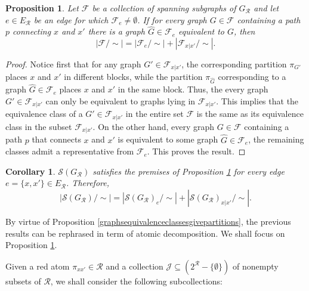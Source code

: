 \documentclass[12pt]{extarticle}
\newtheorem{Corollary}{Corollary}
\newtheorem{Proposition}{Proposition}
\begin{document}
	\begin{Proposition}\label{RecursiveFormula} 	
		Let	$\mathcal{F}$ be a collection of spanning subgraphs of $G_{\mathcal{R}}$ and let $e\in E_{\mathcal{R}}$ be an edge for which $\mathcal{F}_e\neq\emptyset$. If for every graph $G\in\mathcal{F}$ containing a path $p$ connecting $x$ and $x'$ there is a graph $\hat{G}\in\mathcal{F}_e$ equivalent to $G$, then
		\begin{equation}
		|\mathcal{F}/\sim| = 	|\mathcal{F}_e/\sim|+ 	|\mathcal{F}_{x|x'}/\sim|.
		\end{equation}	
	\end{Proposition}
	\begin{proof}
		Notice first that for any graph $G'\in\mathcal{F}_{x|x'}$, the corresponding partition $\pi_{G'}$ places $x$ and $x'$ in different blocks, while the partition $\pi_{\hat{G}}$ corresponding to a graph $\hat{G}\in\mathcal{F}_e$ places $x$ and $x'$ in the same block. Thus, the every graph $G'\in\mathcal{F}_{x|x'}$ can only be equivalent to graphs lying in $\mathcal{F}_{x|x'}$. This implies that the equivalence class of a $G'\in\mathcal{F}_{x|x'}$ in the entire set $\mathcal{F}$ is the same as its equivalence class in the subset $\mathcal{F}_{x|x'}$. On the other hand, every graph $G\in\mathcal{F}$ containing a path $p$ that connects $x$ and $x'$ is equivalent to some graph $\hat{G}\in\mathcal{F}_e$, the remaining classes admit a representative from $\mathcal{F}_e$. This proves the result.
	\end{proof}
	
	\begin{Corollary}
		$\mathcal{S}(G_{\mathcal{R}})$ satisfies the premises of Proposition \ref{RecursiveFormula} for every edge $e=\{x,x'\}\in E_{\mathcal{R}}$. Therefore,
		\begin{equation}
		|\mathcal{S}(G_{\mathcal{R}})/\sim| = 	|\mathcal{S}(G_{\mathcal{R}})_e/\sim|+ 	|\mathcal{S}(G_{\mathcal{R}})_{x|x'}/\sim|.
		\end{equation}
	\end{Corollary}
	
	By virtue of Proposition \ref{graphsequivalenceclassesgivepartitions}, the previous results can be rephrased in term of atomic decomposition. We shall focus on Proposition \ref{RecursiveFormula}. 
	
	Given a red atom $\pi_{xx'}\in\mathcal{R}$ and a collection $\mathcal{J}\subseteq \left(2^{\mathcal{R}}-\{\emptyset\}\right)$ of nonempty subsets of $\mathcal{R}$, we shall consider the following subcollections:
	
\end{document}
